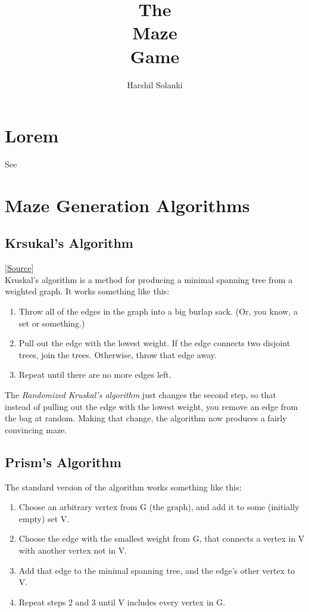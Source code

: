 \documentclass{article}
\begin{document}
\title{
The\\
Maze\\
Game\\
}
\author{Harshil Solanki}
\date{}
\maketitle
\tableofcontents
\clearpage


\section{Lorem}
See~\cite{thebook}

\section{Maze Generation Algorithms}
\subsection{Krsukal's Algorithm}
[\href{https://weblog.jamisbuck.org/2011/1/3/maze-generation-kruskal-s-algorithm}{Source}]\\
Kruskal's algorithm is a method for producing a minimal spanning tree from a weighted graph. It works something like this:

\begin{enumerate}
    \item Throw all of the edges in the graph into a big burlap sack. (Or, you know, a set or something.)
    \item Pull out the edge with the lowest weight. If the edge connects two disjoint trees, join the trees. Otherwise, throw that edge away.
    \item Repeat until there are no more edges left.
\end{enumerate}

The {\it Randomized Kruskal's algorithm} just changes the second step, so that instead of pulling out the edge with the lowest weight, you remove an edge from the bag at random. Making that change, the algorithm now produces a fairly convincing maze.

\subsection{Prism's Algorithm}
The standard version of the algorithm works something like this:
\begin{enumerate}
    \item Choose an arbitrary vertex from G (the graph), and add it to some (initially empty) set V.
    \item Choose the edge with the smallest weight from G, that connects a vertex in V with another vertex not in V.
    \item Add that edge to the minimal spanning tree, and the edge's other vertex to V.
    \item Repeat steps 2 and 3 until V includes every vertex in G.
\end{enumerate}
\end{document}
